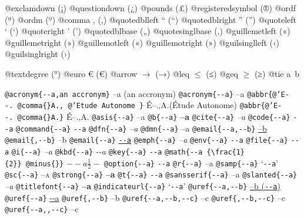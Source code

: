 \documentclass{book}
\newcommand\Texinfocommandstyletextcite[1]{{\normalfont{}\textsl{#1}}}%
\newcommand\Texinfocommandstyletextkbd[1]{{\ttfamily\textsl{#1}}}%
\renewcommand{\_}{\Texinfounderscore\discretionary{}{}{}}
\begin{document}
@exclamdown \textexclamdown{} (¡)
@questiondown \textquestiondown{} (¿)
@pounds \textsterling{} (£)
@registeredsymbol \circledR{} (®)
@ordf \textordfeminine{} (ª)
@ordm \textordmasculine{} (º)
@comma , (,)
@quotedblleft \textquotedblleft{} (“)
@quotedblright \textquotedblright{} (”)
@quoteleft \textquoteleft{} (‘)
@quoteright \textquoteright{} (’)
@quotedblbase \quotedblbase{} („)
@quotesinglbase \quotesinglbase{} (‚)
@guillemetleft \guillemotleft{} («)
@guillemetright \guillemotright{} (»)
@guillemotleft \guillemotleft{} («)
@guillemotright \guillemotright{} (»)
@guilsinglleft \guilsinglleft{} (‹)
@guilsinglright \guilsinglright{} (›)

@textdegree \textdegree{} (°)
@euro \euro{} (€)
@arrow $\rightarrow{}$ (→)
@leq $\leq{}$ (≤)
@geq $\geq{}$ (≥)
@tie a~b

\texttt{@acronym\{{-}{-}a,an accronym\}} --a (an accronym)
\texttt{@acronym\{{-}{-}a\}} --a
\texttt{@abbr\{@'E{-}{-}.\ @comma\{\}A.,\ @'Etude Autonome \}} \'{E}--.\@ ,A.\@ (\'{E}tude Autonome)
\texttt{@abbr\{@'E{-}{-}.\ @comma\{\}A.\}} \'{E}--.\@ ,A.\@
\texttt{@asis\{{-}{-}a\}} --a
\texttt{@b\{{-}{-}a\}} \textbf{--a}
\texttt{@cite\{{-}{-}a\}} \Texinfocommandstyletextcite{--a}
\texttt{@code\{{-}{-}a\}} \texttt{{-}{-}a}
\texttt{@command\{{-}{-}a\}} \texttt{{-}{-}a}
\texttt{@dfn\{{-}{-}a\}} \textsl{--a}
\texttt{@dmn\{{-}{-}a\}} \thinspace --a
\texttt{@email\{{-}{-}a,{-}{-}b\}} \href{mailto:--a}{--b}
\texttt{@email\{,{-}{-}b\}} --b
\texttt{@email\{{-}{-}a\}} \href{mailto:--a}{\nolinkurl{--a}}
\texttt{@emph\{{-}{-}a\}} \emph{--a}
\texttt{@env\{{-}{-}a\}} \texttt{{-}{-}a}
\texttt{@file\{{-}{-}a\}} \texttt{{-}{-}a}
\texttt{@i\{{-}{-}a\}} \textit{--a}
\texttt{@kbd\{{-}{-}a\}} \Texinfocommandstyletextkbd{{-}{-}a}
\texttt{@key\{{-}{-}a\}} \texttt{{-}{-}a}
\texttt{@math\{{-}{-}a \{\textbackslash{}frac\{1\}\{2\}\}\ @minus\{\}\}} $--a {\frac{1}{2}} -$
\texttt{@option\{{-}{-}a\}} \texttt{{-}{-}a}
\texttt{@r\{{-}{-}a\}} \textnormal{--a}
\texttt{@samp\{{-}{-}a\}} `\texttt{{-}{-}a}'
\texttt{@sc\{{-}{-}a\}} \textsc{--a}
\texttt{@strong\{{-}{-}a\}} \textbf{--a}
\texttt{@t\{{-}{-}a\}} \texttt{{-}{-}a}
\texttt{@sansserif\{{-}{-}a\}} \textsf{--a}
\texttt{@slanted\{{-}{-}a\}} \textsl{--a}
\texttt{@titlefont\{{-}{-}a\}} {\huge \bfseries --a}
\texttt{@indicateurl\{{-}{-}a\}} `\texttt{{-}{-}a}'
\texttt{@uref\{{-}{-}a,{-}{-}b\}} \href{--a}{--b (\nolinkurl{--a})}
\texttt{@uref\{{-}{-}a\}} \url{--a}
\texttt{@uref\{,{-}{-}b\}} --b
\texttt{@uref\{{-}{-}a,{-}{-}b,{-}{-}c\}} --c
\texttt{@uref\{,{-}{-}b,{-}{-}c\}} --c
\texttt{@uref\{{-}{-}a{,}{,}{-}{-}c\}} --c
\end{document}
